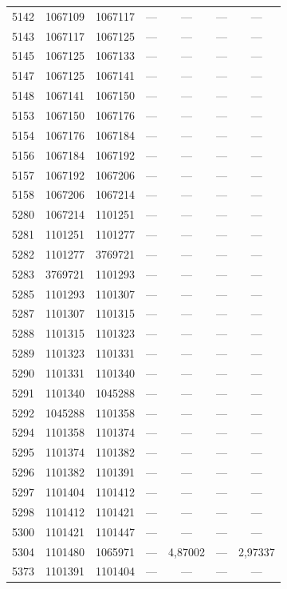 \begin{longtable}{lcccccc}
5142 & 1067109 & 1067117 & --- & --- & --- & --- \\
5143 & 1067117 & 1067125 & --- & --- & --- & --- \\
5145 & 1067125 & 1067133 & --- & --- & --- & --- \\
5147 & 1067125 & 1067141 & --- & --- & --- & --- \\
5148 & 1067141 & 1067150 & --- & --- & --- & --- \\
5153 & 1067150 & 1067176 & --- & --- & --- & --- \\
5154 & 1067176 & 1067184 & --- & --- & --- & --- \\
5156 & 1067184 & 1067192 & --- & --- & --- & --- \\
5157 & 1067192 & 1067206 & --- & --- & --- & --- \\
5158 & 1067206 & 1067214 & --- & --- & --- & --- \\
5280 & 1067214 & 1101251 & --- & --- & --- & --- \\
5281 & 1101251 & 1101277 & --- & --- & --- & --- \\
5282 & 1101277 & 3769721 & --- & --- & --- & --- \\
5283 & 3769721 & 1101293 & --- & --- & --- & --- \\
5285 & 1101293 & 1101307 & --- & --- & --- & --- \\
5287 & 1101307 & 1101315 & --- & --- & --- & --- \\
5288 & 1101315 & 1101323 & --- & --- & --- & --- \\
5289 & 1101323 & 1101331 & --- & --- & --- & --- \\
5290 & 1101331 & 1101340 & --- & --- & --- & --- \\
5291 & 1101340 & 1045288 & --- & --- & --- & --- \\
5292 & 1045288 & 1101358 & --- & --- & --- & --- \\
5294 & 1101358 & 1101374 & --- & --- & --- & --- \\
5295 & 1101374 & 1101382 & --- & --- & --- & --- \\
5296 & 1101382 & 1101391 & --- & --- & --- & --- \\
5297 & 1101404 & 1101412 & --- & --- & --- & --- \\
5298 & 1101412 & 1101421 & --- & --- & --- & --- \\
5300 & 1101421 & 1101447 & --- & --- & --- & --- \\
5304 & 1101480 & 1065971 & --- & 4,87002 & --- & 2,97337 \\
5373 & 1101391 & 1101404 & --- & --- & --- & --- \\

\end{longtable}
